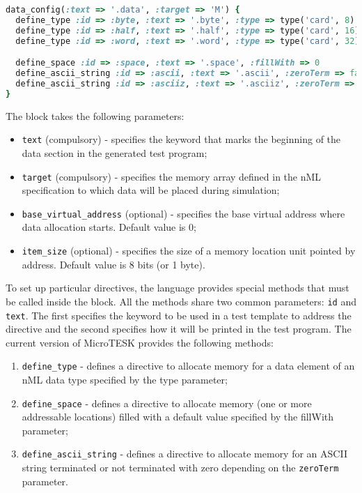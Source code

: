 \documentclass[oneside,final,12pt]{extreport}
\begin{document}
\begin{lstlisting}[language=ruby]
data_config(:text => '.data', :target => 'M') {
  define_type :id => :byte, :text => '.byte', :type => type('card', 8)
  define_type :id => :half, :text => '.half', :type => type('card', 16)
  define_type :id => :word, :text => '.word', :type => type('card', 32)

  define_space :id => :space, :text => '.space', :fillWith => 0
  define_ascii_string :id => :ascii, :text => '.ascii', :zeroTerm => false
  define_ascii_string :id => :asciiz, :text => '.asciiz', :zeroTerm => true
}
\end{lstlisting}

The block takes the following parameters:

\begin{itemize}
  \item \texttt{text} (compulsory) - specifies the keyword that marks the beginning of
        the data section in the generated test program;

  \item \texttt{target} (compulsory) - specifies the memory array defined in the nML
        specification to which data will be placed during simulation;

  \item \texttt{base{\_}virtual{\_}address} (optional) - specifies the base virtual
        address where data allocation starts. Default value is 0;

  \item \texttt{item{\_}size} (optional) - specifies the size of a memory location unit
        pointed by address. Default value is 8 bits (or 1 byte).
\end{itemize}

To set up particular directives, the language provides special methods that must
be called inside the block. All the methods share two common parameters:
\texttt{id} and \texttt{text}. The first specifies the keyword to be used in a
test template to address the directive and the second specifies how it will be
printed in the test program. The current version of MicroTESK provides the following methods:

\begin{enumerate}
  \item \texttt{define{\_}type} - defines a directive to allocate memory for a data element
        of an nML data type specified by the type parameter;

  \item \texttt{define{\_}space} - defines a directive to allocate memory (one or more
        addressable locations) filled with a default value specified by the
        fillWith parameter;

  \item \texttt{define{\_}ascii{\_}string} - defines a directive to allocate memory for an
        ASCII string terminated or not terminated with zero depending on the
        \texttt{zeroTerm} parameter.
\end{enumerate}
\end{document}
